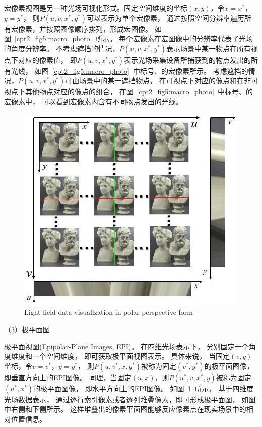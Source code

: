 宏像素视图是另一种光场可视化形式。固定空间维度的坐标$(x, y)$，令$x=x^{*}$，$y=y^{*}$，
则$ P(u, v, x^{*}, y^{*})$可以表示为单个宏像素，
通过按照空间分辨率遍历所有宏像素，并按照图像顺序排列，形成宏图像。
如图~\ref{cpt2_fig5:macro_photo}~所示。
每个宏像素在宏图像中的分辨率代表了光场的角度分辨率。
%
不考虑遮挡的情况，$ P(u, v, x^{*}, y^{*})$表示场景中某一物点在所有视点下对应的像素值，
即$ P(u, v, x^{*}, y^{*})$表示光场采集设备所捕获到的物点发出的所有光线，
如图~\ref{cpt2_fig5:macro_photo}~中标号、的宏像素所示。
考虑遮挡的情况，$ P(u, v, x^{*}, y^{*})$可由场景中的某一遮挡物点，
在可视点下对应的像点和在非可视点下其他物点对应的像点的组合，
在图~\ref{cpt2_fig5:macro_photo}~中标号、的宏像素中，
可以看到宏像素内含有不同物点发出的光线。\par
%
%
%
%
%
\begin{figure}[!ht]
	\centering
	\includegraphics[width=0.75\linewidth]{figures/chapter2/epi_photos}
	{Light field data visualization in polar perspective form}  
	\label{cpt2_fig6:epi_photos}
\end{figure}
%
%
%







（3）极平面图





极平面视图(Epipolar-Plane Images, EPI)。
在四维光场表示下，
分别固定一个角度维度和一个空间维度，
即可获取极平面视图表示。
具体来说，
当固定$(v, y)$坐标，令$v=v^{*}$，$y=y^{*}$，
则$ P(u, v^{*}, x, y^{*})$被称为固定$(v^{*}, y^{*})$的极平面图像，即垂直方向上的EPI图像。
同理，当固定$(u, x)$，则$ P(u^{*}, v, x^{*}, y)$被称为固定$(u^{*}, x^{*})$的极平面图像，
即水平方向上的EPI图像。
如图~\ref{cpt2_fig6:epi_photos}~所示，
基于四维度光场数据表示，
通过逐行索引像素或者逐列堆叠像素，即可形成极平面图，
如图中右侧和下侧所示。
这样堆叠出的像素平面图能够反应像素点在现实场景中的相对位置信息。









